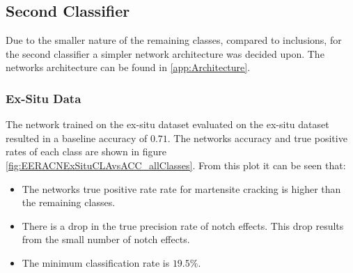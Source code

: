 \newpage
\subsection{Second Classifier}
Due to the smaller nature of the remaining classes, compared to inclusions, for the second classifier a simpler network architecture was decided upon. The networks architecture can be found in \ref{app:Architecture}.


%
%

\subsubsection{Ex-Situ Data}
The network trained on the ex-situ dataset evaluated on the ex-situ dataset resulted in a baseline accuracy of $0.71$. The networks accuracy and true positive rates of each class are shown in figure \ref{fig:EERACNExSituCLAvsACC_allClasses}. From this plot it can be seen that:
\begin{itemize}
\item The networks true positive rate rate for martensite cracking is higher than the remaining classes.
\item There is a drop in the true precision rate of notch effects. This drop results from the small number of notch effects.
\item The minimum classification rate is $19.5\%$. 
\end{itemize}

